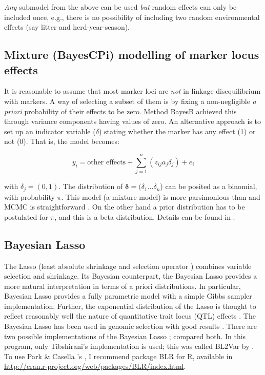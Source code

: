 \documentclass[a4paper,12pt,titlepage]{article}      %
\newcommand{\bsi}{\boldsymbol} %
\begin{document}
\emph{Any} submodel from the above can be used \emph{but} random effects can only be included once, e.g., there is no possibility of including two random environmental effects (say litter and herd-year-season). 


\subsection{Mixture (BayesCPi) modelling of marker locus effects}

It is reasonable to assume that most marker loci are \emph{not} in linkage disequilibrium with markers. A way of selecting a subset of them is by fixing a non-negligible \emph{a priori} probability of their effects to be zero. Method BayesB \cite{Meuwissen2001a} achieved this through variance components having values of zero. An alternative approach is to set up  an indicator variable ($\delta$) stating whether the marker has any effect (1) or not (0). That is, the model becomes:

$$ y_i = \text{other effects} + \sum_{j=1}^{n} \left( z_{ij} a_{j} \delta_{j}  \right) + e_i $$

with $\delta_j = (0,1)$. The distribution of $\bsi{\delta}=(\delta_1 \ldots \delta_n$) can be posited as a binomial, with probability $\pi$. This model (a mixture model) is more parsimonious than \cite{Meuwissen2001a} and MCMC is straightforward \cite{Fernando2010}. On the other hand a prior distribution has to be postulated for $\pi$, and this is a beta distribution. Details can be found in \cite{Kizilkaya2010}.

\subsection{Bayesian Lasso}

The Lasso (least absolute shrinkage and selection
operator \cite{tibshirani1996regression}) combines variable selection
and shrinkage. Its Bayesian counterpart, the
Bayesian Lasso \cite{park2008bl} provides a
more natural interpretation in terms of a priori distributions.
In particular, Bayesian Lasso provides a fully
parametric model with a simple Gibbs sampler implementation. Further, the exponential
distribution of the Lasso is thought to reflect
reasonably well the nature of quantitative trait
locus (QTL) effects \cite{Goddard2009a}. The Bayesian Lasso has been used in genomic selection with good results  \cite{Campos2009a,Legarra2011}.  There are two possible implementations of the Bayesian Lasso  \cite{tibshirani1996regression,park2008bl}; \cite{Legarra2011} compared both. In this program, only Tibshirani's implementation is used; this was called BL2Var by \cite{Legarra2011}. To use Park \& Casella 's \cite{park2008bl}, I recommend package BLR for R, available in 
\href{http://cran.r-project.org/web/packages/BLR/index.html}{http://cran.r-project.org/web/packages/BLR/index.html}.
\end{document}
